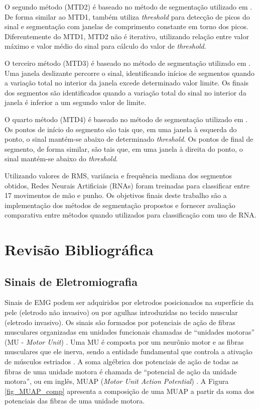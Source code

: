 O segundo método (MTD2) é baseado no método de segmentação utilizado em \cite{Katsis2006}. De forma similar ao MTD1, também utiliza \emph{threshold} para detecção de picos do sinal e segmentação com janelas de comprimento constante em torno dos picos. Diferentemente do MTD1, MTD2 não é iterativo, utilizando relação entre valor máximo e valor médio do sinal para cálculo do valor de \emph{threshold}.

O terceiro método (MTD3) é baseado no método de segmentação utilizado em \cite{Gut2000}. Uma janela deslizante percorre o sinal, identificando inícios de segmentos quando a variação total no interior da janela excede determinado valor limite. Os finais dos segmentos são identificados quando a variação total do sinal no interior da janela é inferior a um segundo valor de limite.

O quarto método (MTD4) é baseado no método de segmentação utilizado em \cite{Pattichis1995}. Os pontos de início do segmento são tais que, em uma janela à esquerda do ponto, o sinal mantém-se abaixo de determinado \emph{threshold}. Os pontos de final de segmento, de forma similar, são tais que, em uma janela à direita do ponto, o sinal mantém-se abaixo do \emph{threshold}.

Utilizando valores de RMS, variância e frequência mediana dos segmentos obtidos, Redes Neurais Artificiais (RNAs) foram treinadas para classificar entre 17 movimentos de mão e punho. Os objetivos finais deste trabalho são a implementação dos métodos de segmentação propostos e fornecer avaliação comparativa entre métodos quando utilizados para classificação com uso de RNA.

	\chapter{Revisão Bibliográfica}
		\section{Sinais de Eletromiografia}
Sinais de EMG podem ser adquiridos por eletrodos posicionados na superfície da pele (eletrodo não invasivo) ou por agulhas introduzidas no tecido muscular (eletrodo invasivo). Os sinais são formados por potenciais de ação de fibras musculares organizadas em unidades funcionais chamadas de ``unidades motoras'' (MU - \emph{Motor Unit}) \cite{Luca2006}. Uma MU é composta por um neurônio motor e as fibras musculares que ele inerva, sendo a entidade fundamental que controla a ativação de músculos estriados \cite{Buchthal980}. A soma algébrica dos potenciais de ação de todas as fibras de uma unidade motora é chamada de ``potencial de ação da unidade motora'', ou em inglês, MUAP (\emph{Motor Unit Action Potential}) \cite{Almeida1997}. A Figura \ref{fig_MUAP_comp} apresenta a composição de uma MUAP a partir da soma dos potenciais das fibras de uma unidade motora.

